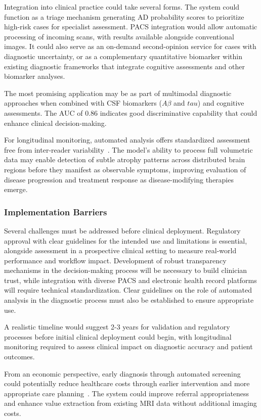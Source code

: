 \documentclass[11pt, a4paper]{article}
\begin{document}
Integration into clinical practice could take several forms. The system could function as a triage mechanism generating AD probability scores to prioritize high-risk cases for specialist assessment. PACS integration would allow automatic processing of incoming scans, with results available alongside conventional images. It could also serve as an on-demand second-opinion service for cases with diagnostic uncertainty, or as a complementary quantitative biomarker within existing diagnostic frameworks that integrate cognitive assessments and other biomarker analyses.

The most promising application may be as part of multimodal diagnostic approaches when combined with CSF biomarkers ($A\beta$ and $tau$) and cognitive assessments. The AUC of 0.86 indicates good discriminative capability that could enhance clinical decision-making.

For longitudinal monitoring, automated analysis offers standardized assessment free from inter-reader variability~\cite{kloppel2008accuracy}. The model's ability to process full volumetric data may enable detection of subtle atrophy patterns across distributed brain regions before they manifest as observable symptoms, improving evaluation of disease progression and treatment response as disease-modifying therapies emerge.

\subsubsection{Implementation Barriers}

Several challenges must be addressed before clinical deployment. Regulatory approval with clear guidelines for the intended use and limitations is essential, alongside assessment in a prospective clinical setting to measure real-world performance and workflow impact. Development of robust transparency mechanisms in the decision-making process will be necessary to build clinician trust, while integration with diverse PACS and electronic health record platforms will require technical standardization. Clear guidelines on the role of automated analysis in the diagnostic process must also be established to ensure appropriate use.

A realistic timeline would suggest 2-3 years for validation and regulatory processes before initial clinical deployment could begin, with longitudinal monitoring required to assess clinical impact on diagnostic accuracy and patient outcomes.

From an economic perspective, early diagnosis through automated screening could potentially reduce healthcare costs through earlier intervention and more appropriate care planning~\cite{jack2018nia}. The system could improve referral appropriateness and enhance value extraction from existing MRI data without additional imaging costs.
\end{document}
